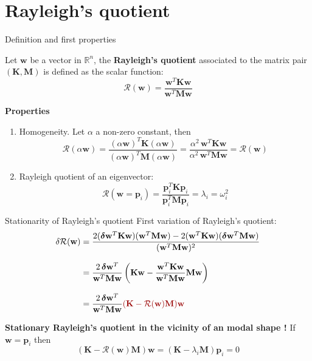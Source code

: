 \documentclass[aspectratio=169]{beamer}
\begin{document}
\section{Rayleigh's quotient}

\begin{frame}{Definition and first properties}
  \begin{block}{}
    Let $\mathbf w$ be a vector in $\mathbb R^n$, the \textbf{Rayleigh's quotient} associated to the matrix pair $(\mathbf K,\mathbf M)$ is defined as the scalar function:
    $$\mathcal R(\mathbf w)=\frac{\mathbf w^T\mathbf K\mathbf w}{\mathbf w^T\mathbf M\mathbf w}$$
  \end{block}
  \textbf{Properties}
  \begin{enumerate}
    \item Homogeneity. Let $\alpha$ a non-zero constant, then
          $$\mathcal{R}(\alpha\mathbf w)=\frac{(\alpha\mathbf w)^T\mathbf K(\alpha\mathbf w)}{(\alpha\mathbf w)^T\mathbf M(\alpha\mathbf w)}=\frac{\alpha^2\, \mathbf w^T\mathbf K\mathbf w}{\alpha^2\, \mathbf w^T\mathbf M\mathbf w}=\mathcal{R}(\mathbf w)$$
    \item Rayleigh quotient of an eigenvector:
          $$\mathcal{R}(\mathbf w=\mathbf p_i)=\frac{\mathbf p_i^T\mathbf K\mathbf p_i}{\mathbf p_i^T\mathbf M\mathbf p_i}=\lambda_i=\omega_i^2$$
  \end{enumerate}
\end{frame}

\begin{frame}{Stationarity of Rayleigh's quotient}
  First variation of Rayleigh's quotient:
  \begin{align*}
    \delta \mathcal{R}(\mathbf{w})
     & = \frac{2(\bolddelta \mathbf{w}^T\mathbf{K} \mathbf{w})(\mathbf{w}^T\mathbf{M} \mathbf{w})
    - 2(\mathbf{w}^T\mathbf{K} \mathbf{w})(\bolddelta\mathbf{w}^T\mathbf{M} \mathbf{w})}{(\mathbf{w}^T\mathbf{M} \mathbf{w})^2}              \\[0.8em]
     & = \frac{2 \, \bolddelta \mathbf{w}^T}{\mathbf{w}^T\mathbf{M} \mathbf{w}}
    \left( \mathbf{K} \mathbf{w} - \frac{\mathbf{w}^T\mathbf{K} \mathbf{w}}{\mathbf{w}^T\mathbf{M} \mathbf{w}} \mathbf{M} \mathbf{w} \right) \\[0.8em]
     & = \frac{2 \, \bolddelta \mathbf{w}^T}{\mathbf{w}^T\mathbf{M} \mathbf{w}}
    {\color{darkred}(\mathbf{K} - \mathcal{R}(\mathbf{w}) \mathbf{M})\mathbf{w}}
  \end{align*}
  \vspace{-0.3cm}
  \begin{block}{\color{darkred} \textbf{Stationary Rayleigh's quotient in the vicinity of an modal shape !}}
    If $\mathbf{w} = \mathbf{p}_i$ then
    \[
      (\mathbf{K} - \mathcal{R}(\mathbf{w}) \mathbf{M})\mathbf{w} = (\mathbf{K} - \lambda_i \mathbf{M}) \mathbf{p}_i  = 0
    \]
  \end{block}
\end{frame}
\end{document}
